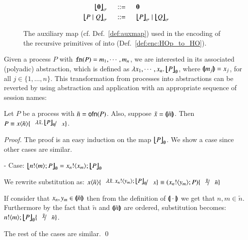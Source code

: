 \begin{definition}
\begin{figure}[t]
\[\begin{array}{rcl}
		\auxmap{\inact}{\sigma} &\bnfis& \inact
		\vspace{1mm} \\

		\auxmap{P \Par Q}{\sigma} &\bnfis& \auxmap{P}{\sigma} \Par \auxmap{Q}{\sigma}
	\end{array}
\]
\caption{\label{fig:auxmap} The auxiliary map (cf. Def.~\ref{def:auxmap}) 
used in the encoding of the recursive primitives of \HOp into \HO (Def.~\ref{def:enc:HOp_to_HO}).}
\end{figure}
\end{definition}

Given a process $P$ with $\mathtt{fn}(P) = m_1, \cdots, m_n$,
we are interested in its associated (polyadic) abstraction,
which is defined as $\lambda x_1, \cdots, x_n.\,\big\lfloor\!\!\big\lfloor P\big\rfloor\!\!\big\rfloor_{\emptyset}$,
where $(\!|\!|m_j|\!|\!) = x_j$, for all $j \in \{1, \ldots, n\}$.
This transformation from processes into abstractions can be reverted by
using abstraction and application with an appropriate sequence of session names:
%
\begin{proposition}\rm
	Let $P$ be a \HOp process with $\tilde{n} = \mathsf{ofn}(P)$.
	Also, suppose $\tilde{x} = (\!|\!|\tilde{n}|\!|\!)$.
	Then $P \scong \appl{x}{\tilde{n}}\subst{\abs{\tilde{x}}\auxmap{P}{\emptyset}}{x}$.
\end{proposition}

\begin{proof}
	\noi The proof is an easy induction on the map $\big\lfloor\!\!\big\lfloor P\big\rfloor\!\!\big\rfloor_{\emptyset}$.
	We show a case since other cases are similar.

	\noi - Case: $\auxmap{\bout{n}{m} P}{\es} = \bout{x_n}{x_m} \auxmap{P}{\es}$

	\noi We rewrite substitution as:
	$\appl{x}{\tilde{n}} \subst{\abs{\tilde{x}}{\bout{x_n}{y_m} \auxmap{P}{\es}}}{x} \scong (\bout{x_n}{y_m} P) \subst{\tilde{x}}{\tilde{n}}$

	\noi If consider that $x_n, y_m \in (\!|\!|\tilde{n}|\!|\!)$ then from the definition of $(\!|\!|\cdot|\!|\!)$ we
	get that $n, m \in \tilde{n}$. Furthermore by the fact that $\tilde{n}$ and $(\!|\!|\tilde{n}|\!|\!)$ are
	ordered, substitution becomes:
	$\bout{n}{m} \auxmap{P}{\es} \subst{\tilde{x}}{\tilde{n}}$.

	\noi The rest of the cases are similar.
	\qed
\end{proof}


